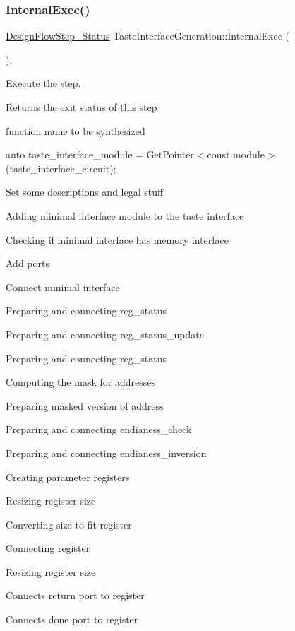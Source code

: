 \subsubsection{\texorpdfstring{Internal\+Exec()}{InternalExec()}}
{\footnotesize\ttfamily \hyperlink{design__flow__step_8hpp_afb1f0d73069c26076b8d31dbc8ebecdf}{Design\+Flow\+Step\+\_\+\+Status} Taste\+Interface\+Generation\+::\+Internal\+Exec (\begin{DoxyParamCaption}{ }\end{DoxyParamCaption})\hspace{0.3cm}{\ttfamily [override]}, {\ttfamily [virtual]}}



Execute the step. 

\begin{DoxyReturn}{Returns}
the exit status of this step 
\end{DoxyReturn}
function name to be synthesized

auto taste\+\_\+interface\+\_\+module = Get\+Pointer$<$const module$>$(taste\+\_\+interface\+\_\+circuit);

Set some descriptions and legal stuff

Adding minimal interface module to the taste interface

Checking if minimal interface has memory interface

Add ports

Connect minimal interface

Preparing and connecting reg\+\_\+status

Preparing and connecting reg\+\_\+status\+\_\+update

Preparing and connecting reg\+\_\+status

Computing the mask for addresses

Preparing masked version of address

Preparing and connecting endianess\+\_\+check

Preparing and connecting endianess\+\_\+inversion

Creating parameter registers

Resizing register size

Converting size to fit register

Connecting register

Resizing register size

Connects return port to register

Connects done port to register

